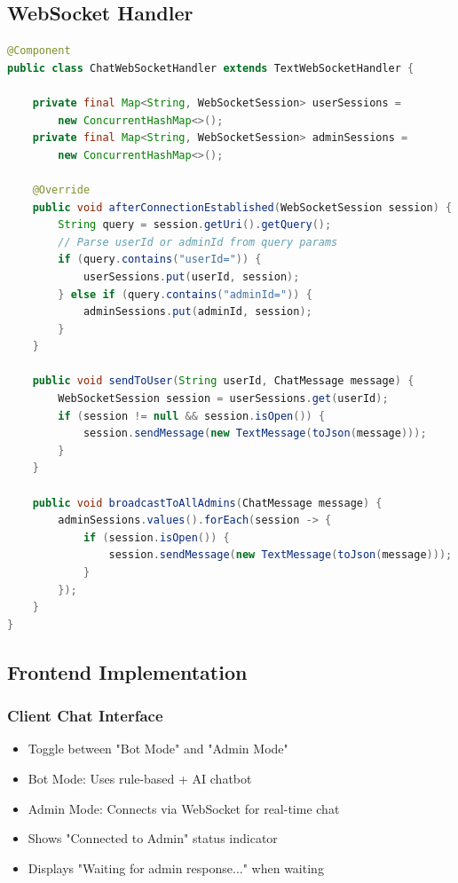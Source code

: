 \documentclass[12pt,a4paper]{article}
\begin{document}
\subsection{WebSocket Handler}
\begin{lstlisting}[language=Java, caption=ChatWebSocketHandler.java]
@Component
public class ChatWebSocketHandler extends TextWebSocketHandler {
    
    private final Map<String, WebSocketSession> userSessions = 
        new ConcurrentHashMap<>();
    private final Map<String, WebSocketSession> adminSessions = 
        new ConcurrentHashMap<>();
    
    @Override
    public void afterConnectionEstablished(WebSocketSession session) {
        String query = session.getUri().getQuery();
        // Parse userId or adminId from query params
        if (query.contains("userId=")) {
            userSessions.put(userId, session);
        } else if (query.contains("adminId=")) {
            adminSessions.put(adminId, session);
        }
    }
    
    public void sendToUser(String userId, ChatMessage message) {
        WebSocketSession session = userSessions.get(userId);
        if (session != null && session.isOpen()) {
            session.sendMessage(new TextMessage(toJson(message)));
        }
    }
    
    public void broadcastToAllAdmins(ChatMessage message) {
        adminSessions.values().forEach(session -> {
            if (session.isOpen()) {
                session.sendMessage(new TextMessage(toJson(message)));
            }
        });
    }
}
\end{lstlisting}

\subsection{Frontend Implementation}

\subsubsection{Client Chat Interface}
\begin{itemize}
    \item Toggle between "Bot Mode" and "Admin Mode"
    \item Bot Mode: Uses rule-based + AI chatbot
    \item Admin Mode: Connects via WebSocket for real-time chat
    \item Shows "Connected to Admin" status indicator
    \item Displays "Waiting for admin response..." when waiting
\end{itemize}
\end{document}
